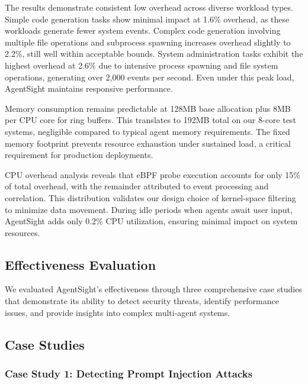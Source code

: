 The results demonstrate consistent low overhead across diverse workload types. Simple code generation tasks show minimal impact at 1.6\% overhead, as these workloads generate fewer system events. Complex code generation involving multiple file operations and subprocess spawning increases overhead slightly to 2.2\%, still well within acceptable bounds. System administration tasks exhibit the highest overhead at 2.6\% due to intensive process spawning and file system operations, generating over 2,000 events per second. Even under this peak load, AgentSight maintains responsive performance.

Memory consumption remains predictable at 128MB base allocation plus 8MB per CPU core for ring buffers. This translates to 192MB total on our 8-core test systems, negligible compared to typical agent memory requirements. The fixed memory footprint prevents resource exhaustion under sustained load, a critical requirement for production deployments.

CPU overhead analysis reveals that eBPF probe execution accounts for only 15\% of total overhead, with the remainder attributed to event processing and correlation. This distribution validates our design choice of kernel-space filtering to minimize data movement. During idle periods when agents await user input, AgentSight adds only 0.2\% CPU utilization, ensuring minimal impact on system resources.

\subsection{Effectiveness Evaluation}

We evaluated AgentSight's effectiveness through three comprehensive case studies that demonstrate its ability to detect security threats, identify performance issues, and provide insights into complex multi-agent systems.

\subsection{Case Studies}

\subsubsection{Case Study 1: Detecting Prompt Injection Attacks}

